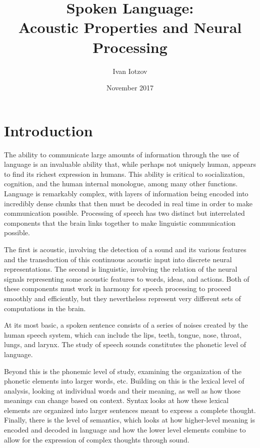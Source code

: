 \documentclass[titlepage]{article}
\title{Spoken Language:\\ Acoustic Properties and Neural Processing}
\author{Ivan Iotzov}
\date{November 2017}
\begin{document}

\maketitle


\section{Introduction} \label{intro}

  The ability to communicate large amounts of information through the use of
  language is an invaluable ability that, while perhaps not uniquely human,
  appears to find its richest expression in humans. This ability is critical to
  socialization, cognition, and the human internal monologue, among many other functions.
  Language is remarkably complex, with layers of information being encoded
  into incredibly dense chunks that then must be decoded in real time in order to make
  communication possible. Processing of speech has two distinct but interrelated
  components that the brain links together to make linguistic communication possible.


  The first is acoustic, involving the detection of a sound and its various features
  and the transduction of this continuous acoustic input into discrete neural representations.
  The second is linguistic, involving the relation of the neural signals representing
  some acoustic features to words, ideas, and actions.
  Both of these components must work in harmony for speech processing to proceed
  smoothly and efficiently, but they nevertheless represent very different sets
  of computations in the brain.


  At its most basic, a spoken sentence consists of a series of noises
  created by the human speech system, which can include the lips, teeth, tongue,
  nose, throat, lungs, and larynx. The study of speech sounds constitutes the
  phonetic level of language.


  Beyond this is the phonemic level of study, examining the organization
  of the phonetic elements into larger words, etc. Building on this is the
  lexical level of analysis, looking at individual words and their meaning, as
  well as how those meanings can change based on context. Syntax looks at how these lexical
  elements are organized into larger sentences meant to express a complete thought. Finally,
  there is the level of semantics, which looks at how higher-level meaning is encoded
  and decoded in language and how the lower level elements combine to
  allow for the expression of complex thoughts through sound.
\end{document}
